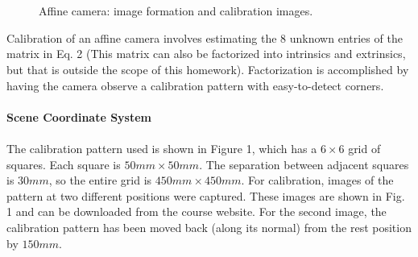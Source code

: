\begin{figure}[ht!]
  \centering
   \\
   \
  \caption{Affine camera: image formation and calibration images.}
  \label{fig:aff}
\end{figure}
Calibration of an affine camera involves estimating the 8 unknown entries of the matrix in Eq. 2 (This matrix can also be factorized into intrinsics and extrinsics, but that is outside the scope of this homework). Factorization is accomplished by having the camera observe a calibration pattern with easy-to-detect corners.
\\
\\
\textbf{Scene Coordinate System}
\\
\\
The calibration pattern used is shown in Figure 1, which has a $6 \times 6$ grid of squares. Each square is $50mm \times 50mm$. The separation between adjacent squares is $30mm$, so the entire grid is $450mm \times 450mm$. For calibration, images of the pattern at two different positions were captured. These images are shown in Fig. 1 and can be downloaded from the course website. For the second image, the calibration pattern has been moved back (along its normal) from the rest position by $150mm$.

